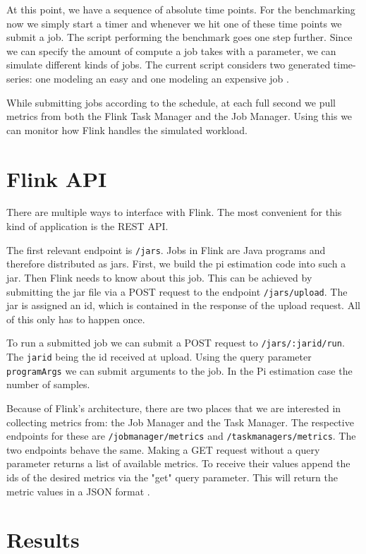At this point, we have a sequence of absolute time points. For the benchmarking now we simply start a timer and whenever we hit one of these time points we submit a job. The script performing the benchmark goes one step further. Since we can specify the amount of compute a job takes with a parameter, we can simulate different kinds of jobs. The current script considers two generated time-series: one modeling an easy and one modeling an expensive job \parencite{flinktest}.

While submitting jobs according to the schedule, at each full second we pull metrics from both the Flink Task Manager and the Job Manager. Using this we can monitor how Flink handles the simulated workload.

\section{Flink API}

There are multiple ways to interface with Flink. The most convenient for this kind of application is the REST API. 

The first relevant endpoint is \texttt{/jars}. Jobs in Flink are Java programs and therefore distributed as jars. First, we build the pi estimation code into such a jar. Then Flink needs to know about this job. This can be achieved by submitting the jar file via a POST request to the endpoint \texttt{/jars/upload}. The jar is assigned an id, which is contained in the response of the upload request. All of this only has to happen once. 

To run a submitted job we can submit a POST request to \texttt{/jars/:jarid/run}. The \texttt{jarid} being the id received at upload. Using the query parameter \texttt{programArgs} we can submit arguments to the job. In the Pi estimation case the number of samples. 

Because of Flink's architecture, there are two places that we are interested in collecting metrics from: the Job Manager and the Task Manager. The respective endpoints for these are \texttt{/jobmanager/metrics} and \texttt{/taskmanagers/metrics}. The two endpoints behave the same. Making a GET request without a query parameter returns a list of available metrics. To receive their values append the ids of the desired metrics via the "get" query parameter. This will return the metric values in a JSON format \parencite{flinkrest}.

\section{Results}


